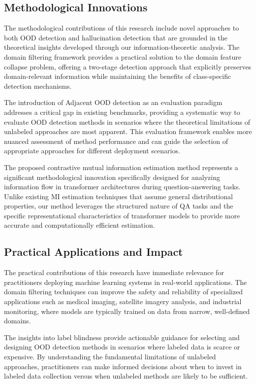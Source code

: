 \documentclass[11pt, oneside]{book}
\theoremstyle{plain}
\theoremstyle{definition}
\theoremstyle{remark}
\begin{document}
\subsection{Methodological Innovations}

The methodological contributions of this research include novel approaches to both OOD detection and hallucination detection that are grounded in the theoretical insights developed through our information-theoretic analysis. The domain filtering framework provides a practical solution to the domain feature collapse problem, offering a two-stage detection approach that explicitly preserves domain-relevant information while maintaining the benefits of class-specific detection mechanisms.

The introduction of Adjacent OOD detection as an evaluation paradigm addresses a critical gap in existing benchmarks, providing a systematic way to evaluate OOD detection methods in scenarios where the theoretical limitations of unlabeled approaches are most apparent. This evaluation framework enables more nuanced assessment of method performance and can guide the selection of appropriate approaches for different deployment scenarios.

The proposed contrastive mutual information estimation method represents a significant methodological innovation specifically designed for analyzing information flow in transformer architectures during question-answering tasks. Unlike existing MI estimation techniques that assume general distributional properties, our method leverages the structured nature of QA tasks and the specific representational characteristics of transformer models to provide more accurate and computationally efficient estimation.

\subsection{Practical Applications and Impact}

The practical contributions of this research have immediate relevance for practitioners deploying machine learning systems in real-world applications. The domain filtering techniques can improve the safety and reliability of specialized applications such as medical imaging, satellite imagery analysis, and industrial monitoring, where models are typically trained on data from narrow, well-defined domains.

The insights into label blindness provide actionable guidance for selecting and designing OOD detection methods in scenarios where labeled data is scarce or expensive. By understanding the fundamental limitations of unlabeled approaches, practitioners can make informed decisions about when to invest in labeled data collection versus when unlabeled methods are likely to be sufficient.
\end{document}

